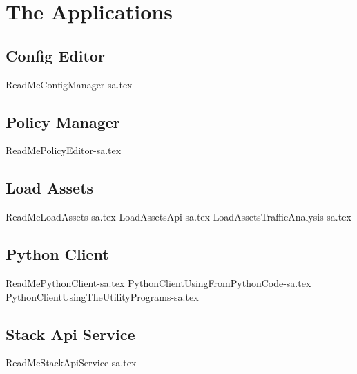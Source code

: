 
\chapter{The Applications}
\label{intro:05} %


\section{Config Editor}
\label{sec:05:1}
{ReadMeConfigManager-sa.tex}

\section{Policy Manager}
\label{sec:05:2}
{ReadMePolicyEditor-sa.tex}

\section{Load Assets}
\label{sec:05:3}
{ReadMeLoadAssets-sa.tex}
{LoadAssetsApi-sa.tex}
{LoadAssetsTrafficAnalysis-sa.tex}

\section{Python Client}
\label{sec:05:4}
{ReadMePythonClient-sa.tex}
{PythonClientUsingFromPythonCode-sa.tex}
{PythonClientUsingTheUtilityPrograms-sa.tex}

\section{Stack Api Service}
\label{sec:05:5}
{ReadMeStackApiService-sa.tex}

